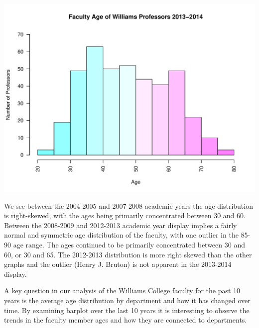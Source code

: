 \documentclass[12pt,a4paper]{article}\usepackage[]{graphicx}\usepackage[]{color}
\makeatletter
\def\maxwidth{ %
  \ifdim\Gin@nat@width>\linewidth
    \linewidth
  \else
    \Gin@nat@width
  \fi
}
\newenvironment{knitrout}{}{} %
\theoremstyle{definition}
\makeatother
\begin{document}
\begin{knitrout}
\includegraphics[width=\maxwidth]{figure/unnamed-chunk-9-10} 

\end{knitrout}

\bigskip
We see between the 2004-2005 and 2007-2008 academic years the age distribution is right-skewed, with the ages being primarily concentrated between 30 and 60. Between the 2008-2009 and 2012-2013 academic year display implies a fairly normal and symmetric age distribution of the faculty, with one outlier in the 85-90 age range. The ages continued to be primarily concentrated between 30 and 60, or 30 and 65. The 2012-2013 distribution is more right skewed than the other graphs and the outlier (Henry J. Bruton) is not apparent in the 2013-2014 display.

\bigskip
A key question in our analysis of the Williams College faculty for the past 10 years is the average age distribution by department and how it has changed over time. By examining barplot over the last 10 years it is interesting to observe the trends in the faculty member ages and how they are connected to departments.
\end{document}
